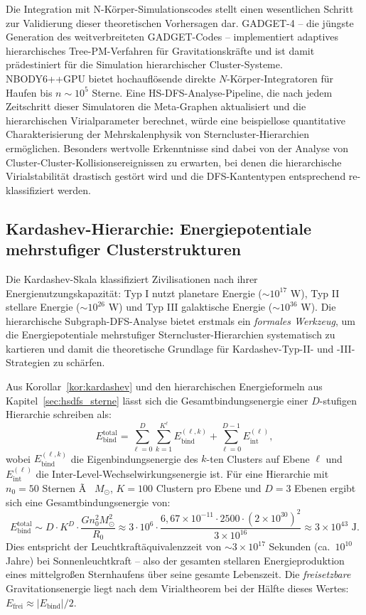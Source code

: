 ﻿\documentclass[a4paper,12pt]{report}
\theoremstyle{definition}
\begin{document}
Die Integration mit N-Körper-Simulationscodes stellt einen wesentlichen Schritt zur Validierung dieser theoretischen Vorhersagen dar. GADGET-4 \cite{springel2021} -- die jüngste Generation des weitverbreiteten GADGET-Codes -- implementiert adaptives hierarchisches Tree-PM-Verfahren für Gravitationskräfte und ist damit prädestiniert für die Simulation hierarchischer Cluster-Systeme. NBODY6++GPU \cite{wang2015} bietet hochauflösende direkte $N$-Körper-Integratoren für Haufen bis $n \sim 10^5$ Sterne. Eine HS-DFS-Analyse-Pipeline, die nach jedem Zeitschritt dieser Simulatoren die Meta-Graphen aktualisiert und die hierarchischen Virialparameter berechnet, würde eine beispiellose quantitative Charakterisierung der Mehrskalenphysik von Sterncluster-Hierarchien ermöglichen. Besonders wertvolle Erkenntnisse sind dabei von der Analyse von Cluster-Cluster-Kollisionsereignissen zu erwarten, bei denen die hierarchische Virialstabilität drastisch gestört wird und die DFS-Kantentypen entsprechend re-klassifiziert werden.

\subsection{Kardashev-Hierarchie: Energiepotentiale mehrstufiger Clusterstrukturen}

Die Kardashev-Skala \cite{kardashev1964} klassifiziert Zivilisationen nach ihrer Energienutzungskapazität: Typ I nutzt planetare Energie ($\sim 10^{17}$ W), Typ II stellare Energie ($\sim 10^{26}$ W) und Typ III galaktische Energie ($\sim 10^{36}$ W). Die hierarchische Subgraph-DFS-Analyse bietet erstmals ein \emph{formales Werkzeug}, um die Energiepotentiale mehrstufiger Sterncluster-Hierarchien systematisch zu kartieren und damit die theoretische Grundlage für Kardashev-Typ-II- und -III-Strategien zu schärfen.

Aus Korollar~\ref{kor:kardashev} und den hierarchischen Energieformeln aus Kapitel~\ref{sec:hsdfs_sterne} lässt sich die Gesamtbindungsenergie einer $D$-stufigen Hierarchie schreiben als:
\[
E_\mathrm{bind}^{\mathrm{total}} = \sum_{\ell=0}^{D} \sum_{k=1}^{K^\ell} E_\mathrm{bind}^{(\ell,k)} + \sum_{\ell=0}^{D-1} E_\mathrm{int}^{(\ell)},
\]
wobei $E_\mathrm{bind}^{(\ell,k)}$ die Eigenbindungsenergie des $k$-ten Clusters auf Ebene $\ell$ und $E_\mathrm{int}^{(\ell)}$ die Inter-Level-Wechselwirkungsenergie ist. Für eine Hierarchie mit $n_0 = 50$ Sternen Ã  $M_\odot$, $K = 100$ Clustern pro Ebene und $D = 3$ Ebenen ergibt sich eine Gesamtbindungsenergie von:
\[
E_\mathrm{bind}^{\mathrm{total}} \sim D \cdot K^D \cdot \frac{G n_0^2 M_\odot^2}{R_0} \approx 3 \cdot 10^6 \cdot \frac{6{,}67 \times 10^{-11} \cdot 2500 \cdot (2 \times 10^{30})^2}{3 \times 10^{16}} \approx 3 \times 10^{43} \text{ J}.
\]
Dies entspricht der Leuchtkraftäquivalenzzeit von $\sim 3 \times 10^{17}$ Sekunden (ca.\ $10^{10}$ Jahre) bei Sonnenleuchtkraft -- also der gesamten stellaren Energieproduktion eines mittelgroßen Sternhaufens über seine gesamte Lebenszeit. Die \emph{freisetzbare} Gravitationsenergie liegt nach dem Virialtheorem bei der Hälfte dieses Wertes: $E_\mathrm{frei} \approx |E_\mathrm{bind}| / 2$.
\end{document}
